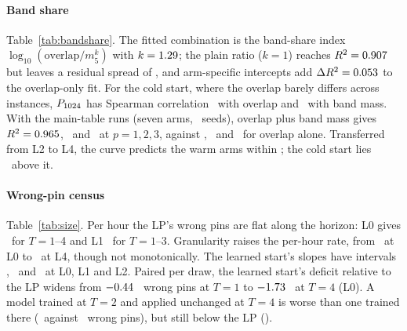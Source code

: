 \documentclass[10pt,conference]{IEEEtran}
\newcommand{\fitcol}[1]{\sbox0{#1}\ifdim\wd0>\columnwidth\resizebox{\columnwidth}{!}{\usebox0}\else\usebox0\fi}
\begin{document}
\begin{table}[t]
\centering
\caption{L4 ($n=\NLfour$, complex64): \LfourNStruct\ structurally distinct instances (one per ground-state/LP-pin signature, covering \LfourCoverage\% of the demand distribution) $\times$ \NSeedsLfour\ seeds, $p=1$. Per-structure mean with 95\% $t$-interval, and the mean reweighted to the demand distribution, at the frozen point and at L4's own calibrated point ($\lambda_D=\OwnLambdaLfour$, $B=\OwnBiasLfour$\,MW).}
\label{tab:lfour}
\scriptsize
\setlength{\tabcolsep}{2pt}
\fitcol{}
\end{table}

\paragraph{Band share} Table~\ref{tab:bandshare}. The fitted combination is the band-share index $\log_{10}(\mathrm{overlap}/m_5^{k})$ with $k=1.29$; the plain ratio ($k=1$) reaches $R^2=0.907$ but leaves a residual spread of \BSSpreadShare, and arm-specific intercepts add $\Delta R^2=0.053$ to the overlap-only fit. For the cold start, where the overlap barely differs across instances, $P_{\KMax}$ has Spearman correlation \BSColdSpearmanOverlap\ with overlap and \BSColdSpearmanBand\ with band mass. With the main-table runs (seven arms, \NSeedsMain\ seeds), overlap plus band mass gives $R^2=0.965$, \BSPhaseTwoBandPTwo\ and \BSPhaseTwoBandPThree\ at $p=1,2,3$, against \BSPhaseTwoOverlapPOne, \BSPhaseTwoOverlapPTwo\ and \BSPhaseTwoOverlapPThree\ for overlap alone. Transferred from L2 to L4, the curve predicts the warm arms within \BSTransferWarmMax; the cold start lies \BSTransferColdResid\ above it.

\begin{table}[t]
\centering
\caption{Logistic fits of $P_{\KMax}$ pooled over all arms and $\varepsilon$ (L2, $p=1$). Arm resid.\ spread: range of the per-arm mean residuals. $\Delta R^2$ arm int.: gain from adding arm-specific intercepts.}
\label{tab:bandshare}
\scriptsize
\setlength{\tabcolsep}{2.5pt}
\fitcol{}
\end{table}

\paragraph{Wrong-pin census} Table~\ref{tab:size}. Per hour the LP's wrong pins are flat along the horizon: L0 gives \PerHourLPLzero\ for $T=1$--4 and L1 \PerHourLPLone\ for $T=1$--3. Granularity raises the per-hour rate, from \PerHourGranLzero\ at L0 to \PerHourGranLfour\ at L4, though not monotonically. The learned start's slopes have intervals \SlopeHorGCNLzeroCI, \SlopeHorGCNLoneCI\ and \SlopeHorGCNLtwoCI\ at L0, L1 and L2. Paired per draw, the learned start's deficit relative to the LP widens from $-0.44$ \GapGCNLPLzeroTOneCI\ wrong pins at $T=1$ to $-1.73$ \GapGCNLPLzeroTFourCI\ at $T=4$ (L0). A model trained at $T=2$ and applied unchanged at $T=4$ is worse than one trained there (\TransferTTwoLzeroTFour\ against \GCNLzeroTFour\ wrong pins), but still below the LP (\LPLzeroTFour).
\end{document}
